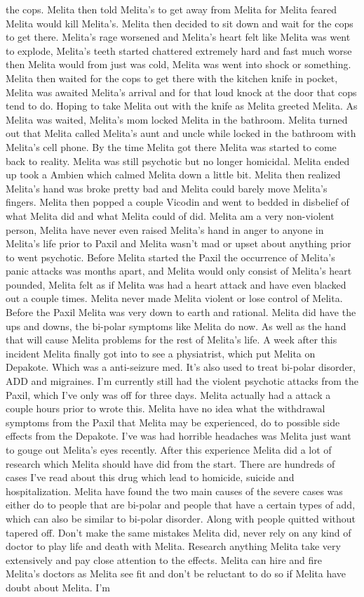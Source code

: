 \documentclass[12pt]{book}
\begin{document}
the cops. Melita then told Melita's to get away from Melita for Melita feared Melita would kill Melita's. Melita then decided to sit down and wait for the cops to get there. Melita's rage worsened and Melita's heart felt like Melita was went to explode, Melita's teeth started chattered extremely hard and fast much worse then Melita would from just was cold, Melita was went into shock or something. Melita then waited for the cops to get there with the kitchen knife in pocket, Melita was awaited Melita's arrival and for that loud knock at the door that cops tend to do. Hoping to take Melita out with the knife as Melita greeted Melita. As Melita was waited, Melita's mom locked Melita in the bathroom. Melita turned out that Melita called Melita's aunt and uncle while locked in the bathroom with Melita's cell phone. By the time Melita got there Melita was started to come back to reality. Melita was still psychotic but no longer homicidal. Melita ended up took a Ambien which calmed Melita down a little bit. Melita then realized Melita's hand was broke pretty bad and Melita could barely move Melita's fingers. Melita then popped a couple Vicodin and went to bedded in disbelief of what Melita did and what Melita could of did. Melita am a very non-violent person, Melita have never even raised Melita's hand in anger to anyone in Melita's life prior to Paxil and Melita wasn't mad or upset about anything prior to went psychotic. Before Melita started the Paxil the occurrence of Melita's panic attacks was months apart, and Melita would only consist of Melita's heart pounded, Melita felt as if Melita was had a heart attack and have even blacked out a couple times. Melita never made Melita violent or lose control of Melita. Before the Paxil Melita was very down to earth and rational. Melita did have the ups and downs, the bi-polar symptoms like Melita do now. As well as the hand that will cause Melita problems for the rest of Melita's life. A week after this incident Melita finally got into to see a physiatrist, which put Melita on Depakote. Which was a anti-seizure med. It's also used to treat bi-polar disorder, ADD and migraines. I'm currently still had the violent psychotic attacks from the Paxil, which I've only was off for three days. Melita actually had a attack a couple hours prior to wrote this. Melita have no idea what the withdrawal symptoms from the Paxil that Melita may be experienced, do to possible side effects from the Depakote. I've was had horrible headaches was Melita just want to gouge out Melita's eyes recently. After this experience Melita did a lot of research which Melita should have did from the start. There are hundreds of cases I've read about this drug which lead to homicide, suicide and hospitalization. Melita have found the two main causes of the severe cases was either do to people that are bi-polar and people that have a certain types of add, which can also be similar to bi-polar disorder. Along with people quitted without tapered off. Don't make the same mistakes Melita did, never rely on any kind of doctor to play life and death with Melita. Research anything Melita take very extensively and pay close attention to the effects. Melita can hire and fire Melita's doctors as Melita see fit and don't be reluctant to do so if Melita have doubt about Melita. I'm 
\end{document}
